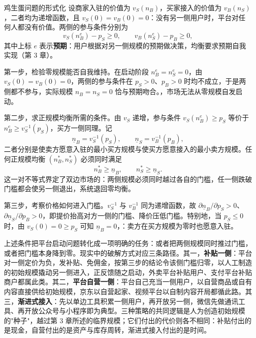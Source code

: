 \begin{derivation}{鸡生蛋问题的形式化}{}
设商家入驻的价值为 $v_S(n_B)$，买家接入的价值为 $v_B(n_S)$，二者均为递增函数，且 $v_S(0) = v_B(0) = 0$：没有另一侧用户时，平台对任何人都没有价值。两侧的参与条件分别为
\[
v_S(n_B^e) - p_S \geq 0, \qquad v_B(n_S^e) - p_B \geq 0,
\]
其中上标 $e$ 表示\textbf{预期}：用户根据对另一侧规模的预期做决策，均衡要求预期自我实现（第 3 章）。

第一步，检验零规模能否自我维持。在启动阶段 $n_B^e = n_S^e = 0$，由 $v_S(0) = v_B(0) = 0$，两侧的参与条件在 $p_S > 0$、$p_B > 0$ 时均不成立，于是两侧都不参与，实际规模 $n_B = n_S = 0$ 恰与预期吻合。，市场无法从零规模自发启动。

第二步，求正规模均衡所需的条件。由 $v_S$ 递增，参与条件 $v_S(n_B^e) \geq p_S$ 等价于 $n_B^e \geq v_S^{-1}(p_S)$，买方一侧同理。记
\[
\underline{n}_B = v_S^{-1}(p_S), \qquad \underline{n}_S = v_B^{-1}(p_B),
\]
二者分别是使卖方愿意入驻的最小买方规模与使买方愿意接入的最小卖方规模。任何正规模均衡 $(n_B^*, n_S^*)$ 必须同时满足
\[
n_B^* \geq \underline{n}_B, \qquad n_S^* \geq \underline{n}_S.
\]
这一对不等式界定了双边市场的：两侧规模必须同时越过各自的门槛，任一侧跌破门槛都会使另一侧退出，系统退回零均衡。

第三步，考察价格如何进入门槛。$v_S^{-1}$ 与 $v_B^{-1}$ 同为递增函数，故 $\partial \underline{n}_B/\partial p_S > 0$、$\partial \underline{n}_S/\partial p_B > 0$，即提价抬高对方一侧的门槛、降价压低门槛。特别地，当 $p_S \leq 0$ 时，由 $v_S(0) = 0 \geq p_S$ 可知 $\underline{n}_B = 0$，：卖方在买方规模为零时也愿意入驻。
\end{derivation}

上述条件把平台启动问题转化成一项明确的任务：或者把两侧规模同时推过门槛，或者把门槛本身降到零。现实中的破解方式对应三条路径。其一，\textbf{补贴一侧}：平台对一侧定价为负，发补贴、免佣金，按第三步的结论令该侧门槛归零，以人工制造的初始规模撬动另一侧进入，正反馈随之启动，外卖平台补贴用户、支付平台补贴商户都属此类。其二，\textbf{平台自营一侧}：平台自己充当一侧用户，以自营商品或自有内容直接供给初始规模，京东以自营起家、视频平台以自制内容开局都循此路。其三，\textbf{渐进式接入}：先以单边工具积累一侧用户，再开放另一侧，微信先做通讯工具、再开放公众号与小程序即为典型。三种策略的共同逻辑是人为创造初始规模的"种子"，越过第 3 章所述的临界规模；它们付出的代价则各不相同：补贴付出的是现金，自营付出的是资产与库存周转，渐进式接入付出的是时间。

